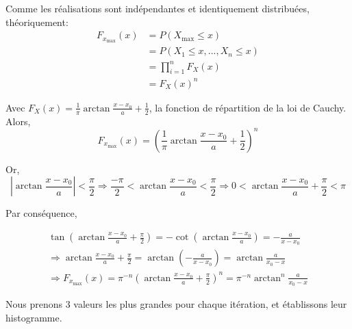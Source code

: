 \documentclass[12pt,a4paper,titlepage]{article}
\numberwithin{equation}{section}
\begin{document}
Comme les réalisations sont indépendantes et identiquement distribuées, théoriquement:
\begin{align*}
{F_{{x_{\max }}}}\left( x \right) & = P\left( {{X_{\max }} \le x} \right)\\
&  = P\left( {{X_1} \le x,...,{X_n} \le x} \right)\\
 & = \prod\limits_{i = 1}^n {{F_X}\left( x \right)} \\
 & = {F_X}{\left( x \right)^n}
\end{align*}

Avec ${F_X}\left( x \right) = \frac{1}{\pi }\arctan \frac{{x - {x_0}}}{a} + \frac{1}{2}$, la fonction de répartition de la loi de Cauchy. Alors, \[{F_{{x_{\max }}}}\left( x \right) = {\left( {\frac{1}{\pi }\arctan \frac{{x - {x_0}}}{a} + \frac{1}{2}} \right)^n}\]

Or, \[\left| {\arctan \frac{{x - {x_0}}}{a}} \right| < \frac{\pi }{2} \Rightarrow \frac{{ - \pi }}{2} < \arctan \frac{{x - {x_0}}}{a} < \frac{\pi }{2} \Rightarrow 0 < \arctan \frac{{x - {x_0}}}{a} + \frac{\pi }{2} < \pi \]

Par conséquence,

\[\begin{array}{l}
\tan \left( {\arctan \frac{{x - {x_0}}}{a} + \frac{\pi }{2}} \right) =  - \cot \left( {\arctan \frac{{x - {x_0}}}{a}} \right) =  - \frac{a}{{x - {x_0}}}\\
 \Rightarrow \arctan \frac{{x - {x_0}}}{a} + \frac{\pi }{2} = \arctan \left( { - \frac{a}{{x - {x_0}}}} \right) = \arctan \frac{a}{{{x_0} - x}}\\
 \Rightarrow {F_{{x_{\max }}}}\left( x \right) = {\pi ^{ - n}}{\left( {\arctan \frac{{x - {x_0}}}{a} + \frac{\pi }{2}} \right)^n} = {\pi ^{ - n}}{\arctan ^n}\frac{a}{{{x_0} - x}}
\end{array}\]
\clearpage

Nous prenons 3 valeurs les plus grandes pour chaque itération, et établissons leur histogramme.

\end{document}
